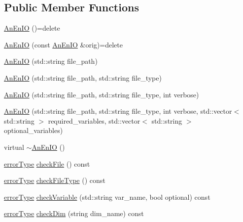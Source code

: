 \subsection*{Public Member Functions}
\begin{DoxyCompactItemize}
\item 
\mbox{\hyperlink{class_an_en_i_o_a199f4cd2569599820126ae27ec25a647}{An\+En\+IO}} ()=delete
\item 
\mbox{\hyperlink{class_an_en_i_o_ab3dc8be2a5d7034cccd35ed72ee41275}{An\+En\+IO}} (const \mbox{\hyperlink{class_an_en_i_o}{An\+En\+IO}} \&orig)=delete
\item 
\mbox{\hyperlink{class_an_en_i_o_ad4b50b97a671e5063e08aa463e393a23}{An\+En\+IO}} (std\+::string file\+\_\+path)
\item 
\mbox{\hyperlink{class_an_en_i_o_af19d6df2100a5922affa88b37a825caf}{An\+En\+IO}} (std\+::string file\+\_\+path, std\+::string file\+\_\+type)
\item 
\mbox{\hyperlink{class_an_en_i_o_a6e33a9ad4a80aabf6c78aae3bcbbf8dd}{An\+En\+IO}} (std\+::string file\+\_\+path, std\+::string file\+\_\+type, int verbose)
\item 
\mbox{\hyperlink{class_an_en_i_o_a054dfff57b8d02d333020d9efb54f14a}{An\+En\+IO}} (std\+::string file\+\_\+path, std\+::string file\+\_\+type, int verbose, std\+::vector$<$ std\+::string $>$ required\+\_\+variables, std\+::vector$<$ std\+::string $>$ optional\+\_\+variables)
\item 
virtual \mbox{\hyperlink{class_an_en_i_o_a1e7aef95fd2a0c6aaef55998f48368f4}{$\sim$\+An\+En\+IO}} ()
\item 
\mbox{\hyperlink{class_an_en_i_o_aa56bc1ec6610b86db4349bce20f9ead0}{error\+Type}} \mbox{\hyperlink{class_an_en_i_o_adf0b96d441687159e1d884273847d68e}{check\+File}} () const
\item 
\mbox{\hyperlink{class_an_en_i_o_aa56bc1ec6610b86db4349bce20f9ead0}{error\+Type}} \mbox{\hyperlink{class_an_en_i_o_aa9b4700db58d0ef09af429d5d31ff55f}{check\+File\+Type}} () const
\item 
\mbox{\hyperlink{class_an_en_i_o_aa56bc1ec6610b86db4349bce20f9ead0}{error\+Type}} \mbox{\hyperlink{class_an_en_i_o_ab7f3ba245b7acb11184e0a5b3490a84b}{check\+Variable}} (std\+::string var\+\_\+name, bool optional) const
\item 
\mbox{\hyperlink{class_an_en_i_o_aa56bc1ec6610b86db4349bce20f9ead0}{error\+Type}} \mbox{\hyperlink{class_an_en_i_o_ab99f9aebd7b145de00fe15b8d4869ac2}{check\+Dim}} (string dim\+\_\+name) const
\item 

\end{DoxyCompactItemize}
